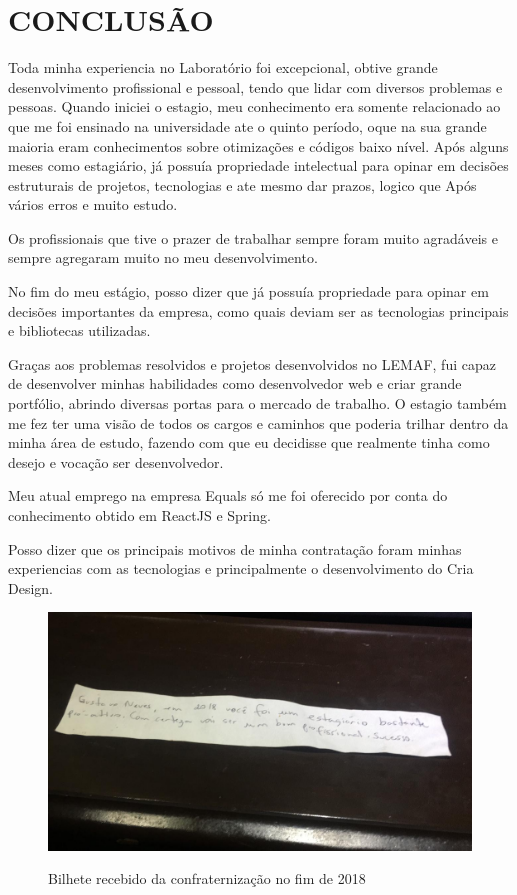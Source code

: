 \chapter{CONCLUSÃO}
\label{cap:conclusao}

Toda minha experiencia no Laboratório foi excepcional, obtive grande desenvolvimento profissional e pessoal, tendo que lidar com diversos problemas e pessoas.
Quando iniciei o estagio, meu conhecimento era somente relacionado ao que me foi ensinado na universidade ate o quinto período, oque na sua grande maioria eram conhecimentos sobre otimizações e códigos baixo nível.
Após alguns meses como estagiário, já possuía propriedade intelectual para opinar em decisões estruturais de projetos, tecnologias e ate mesmo dar prazos, logico que Após vários erros e muito estudo.
 
Os profissionais que tive o prazer de trabalhar sempre foram muito agradáveis e sempre agregaram muito no meu desenvolvimento.

No fim do meu estágio, posso dizer que já possuía propriedade para opinar em decisões importantes da empresa, como quais deviam ser as tecnologias principais e bibliotecas utilizadas.

Graças aos problemas resolvidos e projetos desenvolvidos no LEMAF, fui capaz de desenvolver minhas habilidades como desenvolvedor web e criar grande portfólio, abrindo diversas portas para o mercado de trabalho.
O estagio também me fez ter uma visão de todos os cargos e caminhos que poderia trilhar dentro da minha área de estudo, fazendo com que eu decidisse que realmente tinha como desejo e vocação ser desenvolvedor.

Meu atual emprego na empresa Equals só me foi oferecido por conta do conhecimento obtido em ReactJS e Spring. 

Posso dizer que os principais motivos de minha contratação foram minhas experiencias com as tecnologias e principalmente o desenvolvimento do Cria Design.

\begin{figure}[H]
\centering
\caption{Bilhete recebido da confraternização no fim de 2018} %
\includegraphics[scale=0.3]{agradecimento}\\  %
\label{fig:exemplo} %
\end{figure}